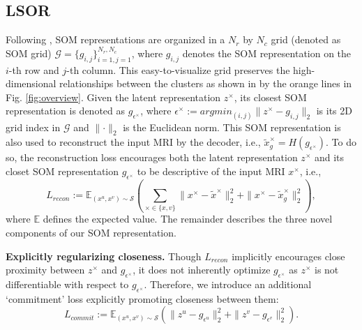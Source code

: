 \documentclass[runningheads]{llncs}
\begin{document}
\subsection{LSOR} 
Following \cite{fortuin2018som,manduchi2019dpsom}, SOM representations are organized in a $N_r$ by $N_c$ grid (denoted as SOM grid) $\mathcal{G}=\{g_{i,j}\}_{i=1,j=1}^{N_r,N_c}$, where $g_{i,j}$ denotes the SOM representation on the $i$-th row and $j$-th column. This easy-to-visualize grid preserves the high-dimensional relationships between the clusters as shown in by the orange lines in Fig. \ref{fig:overview}. Given the latent representation $z^\times$, its closest SOM representation is denoted as $g_{\epsilon^\times}$, where $\epsilon^\times := argmin_{(i,j)} \parallel z^\times - g_{i,j} \parallel_2$ is its 2D grid index in $\mathcal{G}$ and $\parallel \cdot \parallel_2$ is the Euclidean norm. This SOM representation is also used to reconstruct the input MRI by the decoder, i.e., $\tilde{x}^\times_g=H(g_{\epsilon^\times})$.  To do so, the reconstruction loss encourages both the latent representation $z^\times$ and its closet SOM representation $g_{\epsilon^\times}$ to be descriptive of the input MRI $x^\times$, i.e., 
\begin{equation}
\label{eqn:recon}
L_{recon} := \mathbb{E}_{(x^u, x^v) \sim \mathcal{S}} \left( \sum_{\times \in \{x,v\} }\parallel x^\times - \tilde{x}^\times \parallel_2^2 + \parallel x^\times - \tilde{x}^\times_g \parallel_2^2 \right),
\end{equation}
where $\mathbb{E}$ defines the expected value. The remainder describes the three novel components of our SOM representation.  

\textbf{Explicitly regularizing closeness.} Though $L_{recon}$ implicitly encourages close proximity between $z^\times$ and $g_{\epsilon^\times}$, it does not inherently optimize $g_{\epsilon^\times}$ as $z^\times$ is not differentiable with respect to $g_{\epsilon^\times}$. Therefore, we introduce an additional `commitment' loss explicitly promoting closeness between them:
\begin{equation*}
\label{eqn:commit}
L_{commit} := \mathbb{E}_{(x^u, x^v) \sim \mathcal{S}} \left(\parallel z^u - g_{\epsilon^u} \parallel_2^2 + \parallel z^v - g_{\epsilon^v} \parallel_2^2 \right).
\end{equation*}
\end{document}

